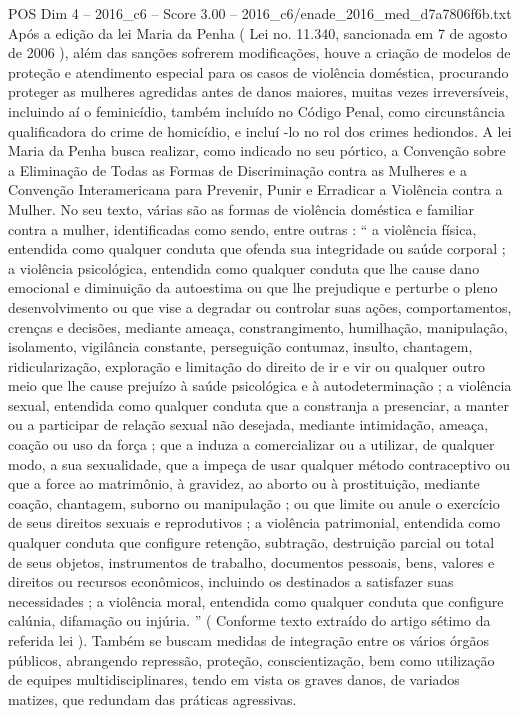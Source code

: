 \begin{textsample}{POS Dim 4 – 2016\_c6 – Score 3.00 – 2016\_c6/enade\_2016\_med\_d7a7806f6b.txt}
Após a edição da lei Maria da Penha ( Lei no. 11.340, sancionada em 7 de agosto de 2006 ), além das sanções sofrerem modificações, houve a criação de modelos de proteção e atendimento especial para os casos de violência doméstica, procurando proteger as mulheres agredidas antes de danos maiores, muitas vezes irreversíveis, incluindo aí o feminicídio, também incluído no Código Penal, como circunstância qualificadora do crime de homicídio, e incluí -lo no rol dos crimes hediondos.
A lei Maria da Penha busca realizar, como indicado no seu pórtico, a Convenção sobre a Eliminação de Todas as Formas de Discriminação contra as Mulheres e a Convenção Interamericana para Prevenir, Punir e Erradicar a Violência contra a Mulher.
No seu texto, várias são as formas de violência doméstica e familiar contra a mulher, identificadas como sendo, entre outras : “ a violência física, entendida como qualquer conduta que ofenda sua integridade ou saúde corporal ; a violência psicológica, entendida como qualquer conduta que lhe cause dano emocional e diminuição da autoestima ou que lhe prejudique e perturbe o pleno desenvolvimento ou que vise a degradar ou controlar suas ações, comportamentos, crenças e decisões, mediante ameaça, constrangimento, humilhação, manipulação, isolamento, vigilância constante, perseguição contumaz, insulto, chantagem, ridicularização, exploração e limitação do direito de ir e vir ou qualquer outro meio que lhe cause prejuízo à saúde psicológica e à autodeterminação ; a violência sexual, entendida como qualquer conduta que a constranja a presenciar, a manter ou a participar de relação sexual não desejada, mediante intimidação, ameaça, coação ou uso da força ; que a induza a comercializar ou a utilizar, de qualquer modo, a sua sexualidade, que a impeça de usar qualquer método contraceptivo ou que a force ao matrimônio, à gravidez, ao aborto ou à prostituição, mediante coação, chantagem, suborno ou manipulação ; ou que limite ou anule o exercício de seus direitos sexuais e reprodutivos ; a violência patrimonial, entendida como qualquer conduta que configure retenção, subtração, destruição parcial ou total de seus objetos, instrumentos de trabalho, documentos pessoais, bens, valores e direitos ou recursos econômicos, incluindo os destinados a satisfazer suas necessidades ; a violência moral, entendida como qualquer conduta que configure calúnia, difamação ou injúria. ” ( Conforme texto extraído do artigo sétimo da referida lei ).
Também se buscam medidas de integração entre os vários órgãos públicos, abrangendo repressão, proteção, conscientização, bem como utilização de equipes multidisciplinares, tendo em vista os graves danos, de variados matizes, que redundam das práticas agressivas.

\end{textsample}
